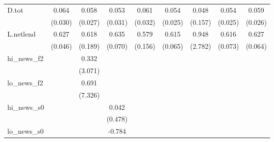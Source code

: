 {\begin{tabular}{l*{8}{c}}
\addlinespace
D.tot       &       0.064\sym{**} &       0.058\sym{**} &       0.053\sym{*}  &       0.061\sym{*}  &       0.054\sym{**} &       0.048         &       0.054\sym{**} &       0.059\sym{**} \\
            &     (0.030)         &     (0.027)         &     (0.031)         &     (0.032)         &     (0.025)         &     (0.157)         &     (0.025)         &     (0.026)         \\
\addlinespace
L.netlend   &       0.627\sym{***}&       0.618\sym{***}&       0.635\sym{***}&       0.579\sym{***}&       0.615\sym{***}&       0.948         &       0.616\sym{***}&       0.627\sym{***}\\
            &     (0.046)         &     (0.189)         &     (0.070)         &     (0.156)         &     (0.065)         &     (2.782)         &     (0.073)         &     (0.064)         \\
\addlinespace
hi\_news\_f2  &                     &       0.332         &                     &                     &                     &                     &                     &                     \\
            &                     &     (3.071)         &                     &                     &                     &                     &                     &                     \\
\addlinespace
lo\_news\_f2  &                     &       0.691         &                     &                     &                     &                     &                     &                     \\
            &                     &     (7.326)         &                     &                     &                     &                     &                     &                     \\
\addlinespace
hi\_news\_s0  &                     &                     &       0.042         &                     &                     &                     &                     &                     \\
            &                     &                     &     (0.478)         &                     &                     &                     &                     &                     \\
\addlinespace
lo\_news\_s0  &                     &                     &      -0.784         &                     &                     &                     &                     &                     \\

\end{tabular}}
